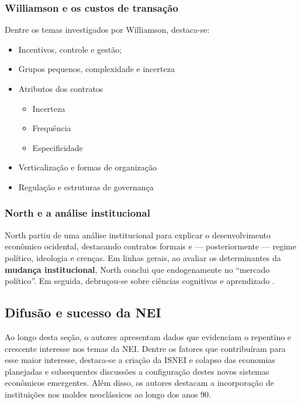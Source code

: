\subsubsection*{Williamson e os custos de transação}

Dentre os temas investigados por Williamson, destaca-se:

\begin{itemize}
	\item Incentivos, controle e gestão;
	\item Grupos pequenos, complexidade e incerteza
	\item Atributos dos contratos
	\begin{itemize}
		\item Incerteza
		\item Frequência
		\item Especificidade
	\end{itemize}
	\item Verticalização e formas de organização
	\item Regulação e estruturas de governança
\end{itemize}


\subsubsection*{North e a análise institucional}

North partiu de uma análise institucional para explicar o desenvolvimento econômico ocidental, destacando contratos formais e --- posteriormente --- regime político, ideologia e crenças. Em linhas gerais, ao avaliar os determinantes da \textbf{mudança institucional}, North conclui que endogenamente no ``mercado político''. Em seguida, debruçou-se sobre ciências cognitivas e aprendizado .

\subsection*{Difusão e sucesso da NEI}

Ao longo desta seção, o autores apresentam dados que evidenciam o repentino e crescente interesse nos temas da NEI. Dentre os fatores que contribuíram para esse maior interesse, destaca-se a criação da ISNEI e colapso das economias planejadas e subsequentes discussões a configuração destes novos sistemas econômicos emergentes.
Além disso, os autores destacam a incorporação de instituições nos moldes neoclássicos ao longo dos anos 90.


